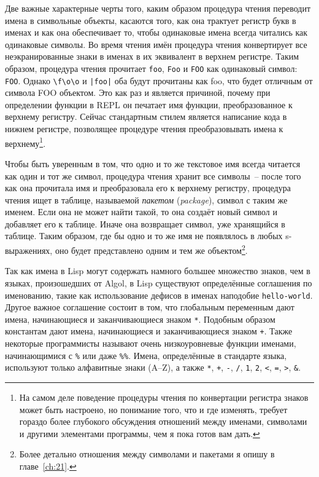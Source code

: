Две важные характерные черты того, каким образом процедура чтения переводит имена в
символьные объекты, касаются того, как она трактует регистр букв в именах и как она
обеспечивает то, чтобы одинаковые имена всегда читались как одинаковые символы. Во время
чтения имён процедура чтения конвертирует все неэкранированные знаки в именах в их
эквивалент в верхнем регистре. Таким образом, процедура чтения прочитает \lstinline{foo},
\lstinline{Foo} и \lstinline{FOO} как одинаковый символ: \lstinline{FOO}. Однако
\lstinline!\f\o\o! и \lstinline!|foo|! оба 
будут прочитаны как foo, что будет отличным от символа FOO объектом. Это как раз и
является причиной, почему при определении функции в REPL он печатает имя функции,
преобразованное к верхнему регистру. Сейчас стандартным стилем является написание кода в
нижнем регистре, позволящее процедуре чтения преобразовывать имена к верхнему\footnote{На
  самом деле поведение процедуры чтения по конвертации регистра знаков может быть
  настроено, но понимание того, что и где изменять, требует гораздо более глубокого
  обсуждения отношений между именами, символами и другими элементами программы, чем
  я пока готов вам дать.}.

Чтобы быть уверенным в том, что одно и то же текстовое имя всегда читается как один и тот
же символ, процедура чтения хранит все символы~-- после того как она прочитала имя и
преобразовала его к верхнему регистру, процедура чтения ищет в таблице, называемой
\textit{пакетом} (\textit{package}), символ с таким же именем. Если она не может найти
такой, то она создаёт новый символ и добавляет его к таблице. Иначе она возвращает символ,
уже хранящийся в таблице. Таким образом, где бы одно и то же имя не появлялось в любых
s-выражениях, оно будет представлено одним и тем же объектом\footnote{Более детально
  отношения между символами и пакетами я опишу в главе~\ref{ch:21}.}.

Так как имена в Lisp могут содержать намного большее множество знаков, чем в языках,
произошедших от Algol, в Lisp существуют определённые соглашения по именованию, такие как
использование дефисов в именах наподобие \lstinline{hello-world}. Другое важное соглашение
состоит в том, что глобальным переменным дают имена, начинающиеся и заканчивающиеся знаком
\lstinline{*}. Подобным образом константам дают имена, начинающиеся и заканчивающиеся знаком
\lstinline{+}. Также некоторые программисты называют очень низкоуровневые функции именами,
начинающимися с \lstinline!%! или даже \lstinline!%%!. Имена, определённые в стандарте
языка, используют только алфавитные знаки (A--Z), а также \lstinline{*}, \lstinline{+}, \lstinline{-},
\lstinline{/}, \lstinline{1}, \lstinline{2}, \lstinline{<}, \lstinline{=}, \lstinline{>}, \lstinline{&}.

